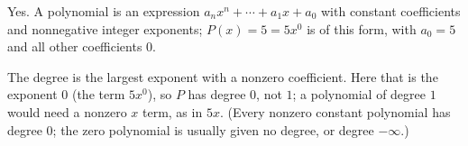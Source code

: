 Yes. A polynomial is an expression $a_nx^n+\cdots+a_1x+a_0$ with constant coefficients and nonnegative integer exponents; $P(x)=5=5x^0$ is of this form, with $a_0=5$ and all other coefficients $0$.

The degree is the largest exponent with a nonzero coefficient. Here that is the exponent $0$ (the term $5x^0$), so $P$ has degree $\boxed{0}$, not $1$; a polynomial of degree $1$ would need a nonzero $x$ term, as in $5x$. (Every nonzero constant polynomial has degree $0$; the zero polynomial is usually given no degree, or degree $-\infty$.)
